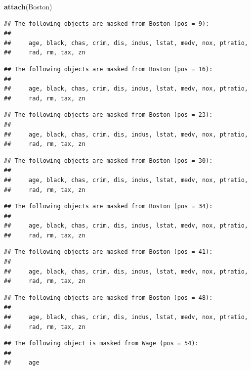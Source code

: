 \documentclass[]{book}
\newenvironment{Shaded}{\begin{snugshade}}{\end{snugshade}}
\newcommand{\KeywordTok}[1]{\textcolor[rgb]{0.13,0.29,0.53}{\textbf{#1}}}
\newcommand{\NormalTok}[1]{#1}
\begin{document}
\begin{Shaded}
\begin{Highlighting}[]
\KeywordTok{attach}\NormalTok{(Boston)}
\end{Highlighting}
\end{Shaded}

\begin{verbatim}
## The following objects are masked from Boston (pos = 9):
## 
##     age, black, chas, crim, dis, indus, lstat, medv, nox, ptratio,
##     rad, rm, tax, zn
\end{verbatim}

\begin{verbatim}
## The following objects are masked from Boston (pos = 16):
## 
##     age, black, chas, crim, dis, indus, lstat, medv, nox, ptratio,
##     rad, rm, tax, zn
\end{verbatim}

\begin{verbatim}
## The following objects are masked from Boston (pos = 23):
## 
##     age, black, chas, crim, dis, indus, lstat, medv, nox, ptratio,
##     rad, rm, tax, zn
\end{verbatim}

\begin{verbatim}
## The following objects are masked from Boston (pos = 30):
## 
##     age, black, chas, crim, dis, indus, lstat, medv, nox, ptratio,
##     rad, rm, tax, zn
\end{verbatim}

\begin{verbatim}
## The following objects are masked from Boston (pos = 34):
## 
##     age, black, chas, crim, dis, indus, lstat, medv, nox, ptratio,
##     rad, rm, tax, zn
\end{verbatim}

\begin{verbatim}
## The following objects are masked from Boston (pos = 41):
## 
##     age, black, chas, crim, dis, indus, lstat, medv, nox, ptratio,
##     rad, rm, tax, zn
\end{verbatim}

\begin{verbatim}
## The following objects are masked from Boston (pos = 48):
## 
##     age, black, chas, crim, dis, indus, lstat, medv, nox, ptratio,
##     rad, rm, tax, zn
\end{verbatim}

\begin{verbatim}
## The following object is masked from Wage (pos = 54):
## 
##     age
\end{verbatim}
\end{document}
